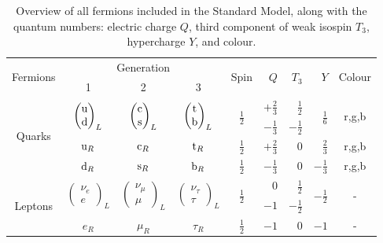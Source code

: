 \begin{table}[t]
  \centering
  \begin{tabular}{ c  c c c  c  r  r  r  c }
    \toprule
    \multirow{2}{*}{Fermions} & \multicolumn{3}{c}{Generation} & \multirow{2}{*}{Spin} &
\multirow{2}{*}{$Q$} & \multirow{2}{*}{$T_3$} & \multirow{2}{*}{$Y$} & \multirow{2}{*}{Colour} \\ 
    & 1 & 2 & 3                      & & & & &  \\ 
    \midrule
    \multirow{4}{*}{Quarks} & \multirow{2}{*}{$\begin{pmatrix} \mathrm{u} \\ \mathrm{d} \end{pmatrix}_L$} 
                            & \multirow{2}{*}{$\begin{pmatrix} \mathrm{c} \\ \mathrm{s} \end{pmatrix}_L$}
                            & \multirow{2}{*}{$\begin{pmatrix} \mathrm{t} \\ \mathrm{b} \end{pmatrix}_L$} 
                            & \multirow{2}{*}{$\frac{1}{2}$} & $+\frac{2}{3}$ & $\frac{1}{2}$ &
\multirow{2}{*}{$\frac{1}{6}$} & \multirow{2}{*}{r,g,b} \\[1ex]
    &  &  &  & & $-\frac{1}{3}$ & $-\frac{1}{2}$ & &   \\
    \cmidrule(lr){2-9}
    & $\mathrm{u}_R$ & $\mathrm{c}_R$ & $\mathrm{t}_R$ & $\frac{1}{2}$ & $+\frac{2}{3}$ & $0$ & $\frac{2}{3}$&
r,g,b \\[1ex]
    & $\mathrm{d}_R$ & $\mathrm{s}_R$ & $\mathrm{b}_R$ & $\frac{1}{2}$ & $-\frac{1}{3}$ & $0$ & $-\frac{1}{3}$ &
r,g,b \\    
    \midrule
    \multirow{3}{*}{Leptons} & \multirow{2}{*}{$\begin{pmatrix} \nu_e \\ e \end{pmatrix}_L$} 
                             & \multirow{2}{*}{$\begin{pmatrix} \nu_\mu \\ \mu \end{pmatrix}_L$} 
                             & \multirow{2}{*}{$\begin{pmatrix} \nu_\tau \\ \tau \end{pmatrix}_L$} 
                             & \multirow{2}{*}{$\frac{1}{2}$} & 0 & $\frac{1}{2}$ &
\multirow{2}{*}{$-\frac{1}{2}$} & \multirow{2}{*}{-}  \\[1ex]
    &  &  &  & & $-1$ & $-\frac{1}{2}$ &  &   \\
    \cmidrule(lr){2-9}
    & $e_R$ & $\mu_R$ & $\tau_R$ & $\frac{1}{2}$ & $-1$ & 0 & $-1$ & - \\
  \bottomrule
  \end{tabular}
  \caption{Overview of all fermions included in the Standard Model, along with the quantum
numbers: electric charge $Q$, third component of weak isospin $T_3$, hypercharge $Y$, and colour.}
  \label{tab:SM_particles}
\end{table}


